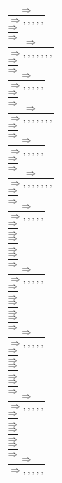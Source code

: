 \documentclass[11pt]{article}
\begin{document}
\begin{center}
\bigskip
\\$\frac{\Rightarrow }{\Rightarrow , , , , , }$
\bigskip
\\$\frac{\Rightarrow }{\Rightarrow }$
\bigskip
\\$\frac{\Rightarrow }{\Rightarrow , , , , , , , }$
\bigskip
\\$\frac{\Rightarrow }{\Rightarrow }$
\bigskip
\\$\frac{\Rightarrow }{\Rightarrow , , , , , }$
\bigskip
\\$\frac{\Rightarrow }{\Rightarrow }$
\bigskip
\\$\frac{\Rightarrow }{\Rightarrow , , , , , , , }$
\bigskip
\\$\frac{\Rightarrow }{\Rightarrow }$
\bigskip
\\$\frac{\Rightarrow }{\Rightarrow , , , , , }$
\bigskip
\\$\frac{\Rightarrow }{\Rightarrow }$
\bigskip
\\$\frac{\Rightarrow }{\Rightarrow , , , , , , , }$
\bigskip
\\$\frac{\Rightarrow }{\Rightarrow }$
\bigskip
\\$\frac{\Rightarrow }{\Rightarrow , , , , , }$
\bigskip
\\$\frac{\Rightarrow }{\Rightarrow }$
\bigskip
\\$\frac{\Rightarrow }{\Rightarrow }$
\bigskip
\\$\frac{\Rightarrow }{\Rightarrow }$
\bigskip
\\$\frac{\Rightarrow }{\Rightarrow , , , , , }$
\bigskip
\\$\frac{\Rightarrow }{\Rightarrow }$
\bigskip
\\$\frac{\Rightarrow }{\Rightarrow }$
\bigskip
\\$\frac{\Rightarrow }{\Rightarrow }$
\bigskip
\\$\frac{\Rightarrow }{\Rightarrow , , , , , }$
\bigskip
\\$\frac{\Rightarrow }{\Rightarrow }$
\bigskip
\\$\frac{\Rightarrow }{\Rightarrow }$
\bigskip
\\$\frac{\Rightarrow }{\Rightarrow }$
\bigskip
\\$\frac{\Rightarrow }{\Rightarrow , , , , , }$
\bigskip
\\$\frac{\Rightarrow }{\Rightarrow }$
\bigskip
\\$\frac{\Rightarrow }{\Rightarrow }$
\bigskip
\\$\frac{\Rightarrow }{\Rightarrow }$
\bigskip
\\$\frac{\Rightarrow }{\Rightarrow , , , , , }$

\end{center}
\end{document}
